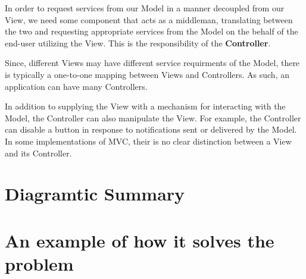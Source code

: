In order to request services from our Model in a manner decoupled from our View, we need some component that acts as a middleman, translating between the two and requesting appropriate services from the Model on the behalf of the end-user utilizing the View. This is the responsibility of the \textbf{Controller}.

Since, different Views may have different service requirments of the Model, there is typically a one-to-one mapping between Views and Controllers. As such, an application can have many Controllers. 

In addition to supplying the View with a mechanism for interacting with the Model, the Controller can also manipulate the View. For example, the Controller can disable a button in response to notifications sent or delivered by the Model. In some implementations of MVC, their is no clear distinction between a View and its Controller. 

\section{Diagramtic Summary}

\begin{center}



\end{center}


\section{An example of how it solves the problem}


